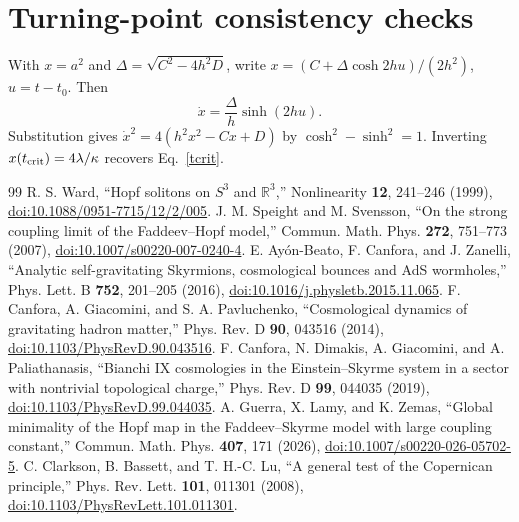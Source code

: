 \documentclass[aps,prd,reprint,longbibliography,nofootinbib,superscriptaddress]{revtex4-2}
\begin{document}
\section{Turning-point consistency checks}
With $x=a^2$ and $\Delta=\sqrt{C^2-4h^2D}$, write $x=(C+\Delta\cosh2hu)/(2h^2)$, $u=t-t_0$. Then
\begin{equation}
 \dot x=\frac{\Delta}{h}\sinh(2hu).
\end{equation} Substitution gives $\dot x^2=4(h^2x^2-Cx+D)$ by $\cosh^2-\sinh^2=1$. Inverting $x(t_{\rm crit})=4\lambda/\kappa$ recovers Eq.~\eqref{tcrit}.


\begin{thebibliography}{99}
 R. S. Ward, ``Hopf solitons on $S^3$ and $\mathbb R^3$,'' Nonlinearity \textbf{12}, 241--246 (1999), \href{https://doi.org/10.1088/0951-7715/12/2/005}{doi:10.1088/0951-7715/12/2/005}.
 J. M. Speight and M. Svensson, ``On the strong coupling limit of the Faddeev--Hopf model,'' Commun. Math. Phys. \textbf{272}, 751--773 (2007), \href{https://doi.org/10.1007/s00220-007-0240-4}{doi:10.1007/s00220-007-0240-4}.
 E. Ay\'on-Beato, F. Canfora, and J. Zanelli, ``Analytic self-gravitating Skyrmions, cosmological bounces and AdS wormholes,'' Phys. Lett. B \textbf{752}, 201--205 (2016), \href{https://doi.org/10.1016/j.physletb.2015.11.065}{doi:10.1016/j.physletb.2015.11.065}.
 F. Canfora, A. Giacomini, and S. A. Pavluchenko, ``Cosmological dynamics of gravitating hadron matter,'' Phys. Rev. D \textbf{90}, 043516 (2014), \href{https://doi.org/10.1103/PhysRevD.90.043516}{doi:10.1103/PhysRevD.90.043516}.
 F. Canfora, N. Dimakis, A. Giacomini, and A. Paliathanasis, ``Bianchi IX cosmologies in the Einstein--Skyrme system in a sector with nontrivial topological charge,'' Phys. Rev. D \textbf{99}, 044035 (2019), \href{https://doi.org/10.1103/PhysRevD.99.044035}{doi:10.1103/PhysRevD.99.044035}.
 A. Guerra, X. Lamy, and K. Zemas, ``Global minimality of the Hopf map in the Faddeev--Skyrme model with large coupling constant,'' Commun. Math. Phys. \textbf{407}, 171 (2026), \href{https://doi.org/10.1007/s00220-026-05702-5}{doi:10.1007/s00220-026-05702-5}.
 C. Clarkson, B. Bassett, and T. H.-C. Lu, ``A general test of the Copernican principle,'' Phys. Rev. Lett. \textbf{101}, 011301 (2008), \href{https://doi.org/10.1103/PhysRevLett.101.011301}{doi:10.1103/PhysRevLett.101.011301}.
\end{thebibliography}
\end{document}
